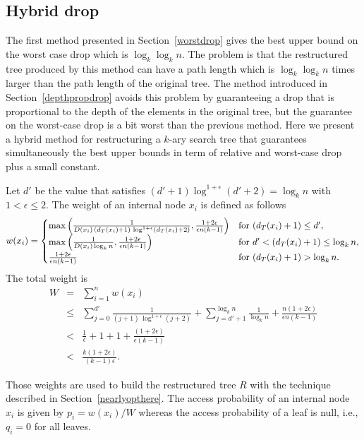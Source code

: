 \documentclass{llncs}\usepackage[english]{babel}
\begin{document}
\subsection{Hybrid drop}
\label{hybrid}
The first method presented in Section~\ref{worstdrop} gives the best upper bound on the worst case drop which is $\log_k \log_k n$. The problem is that the restructured tree produced by this method can have a path length which is $\log_k \log_k n$ times larger than the path length of the original tree. The method introduced in Section~\ref{depthpropdrop} avoids this problem by guaranteeing a drop that is proportional to the depth of the elements in the original tree, but the guarantee on the worst-case drop is a bit worst than the previous method. Here we present a hybrid method for restructuring a $k$-ary search tree that guarantees simultaneously the best upper bounds in term of relative and worst-case drop plus a small constant. 

Let $d'$ be the value that satisfies $(d'+1)\log^{1+\epsilon}(d'+2)=\log_k n$ with $1<\epsilon \leq 2$. The weight of an internal node $x_i$ is defined as follows
\vspace{-0.2cm}
$$
w(x_i)=
\begin{cases}
\max\left( \frac{1}{D(x_i) \, (d_T(x_i)+1)\, \log^{1+\epsilon}(d_T(x_i)+2)}, \frac{1+2\epsilon}{\epsilon n (k-1)}\right) & \text{for  $(d_T(x_i)+1)\leq d'$,}\\
\max\left( \frac{1}{D(x_i) \log_k n} , \frac{1+2\epsilon}{\epsilon n (k-1)}\right) & \text{for  $d'< (d_T(x_i)+1)\leq \log_k n$,}\\
\frac{1+2\epsilon}{\epsilon n (k-1)} & \text{for  $ (d_T(x_i)+1)> \log_k n$.}
\end{cases}
$$
The total weight is 
\vspace{-0.2cm}
\begin{eqnarray*}
W&=&\sum_{i=1}^n w(x_i)\\
&\leq&  \sum_{j=0}^{d'}\frac{1}{ (j+1)\, \log^{1+\epsilon}(j+2)} + \sum_{j=d'+1}^{\log_k n} \frac{1}{ \log_k n} + \frac{n(1+2\epsilon)}{\epsilon n (k-1)}\\
&<&  \frac{1}{\epsilon}+1 + 1+ \frac{(1+2\epsilon)}{\epsilon (k-1)}\\
&<& \frac{k(1+2\epsilon)}{(k-1)\epsilon}.
\end{eqnarray*}

Those weights are used to build the restructured tree $R$ with the technique described in Section~\ref{nearlyopthere}. The access probability of an internal node $x_i$ is given by $p_i=w(x_i)/W$ whereas the access probability of a leaf is null, i.e., $q_i=0$ for all leaves.
\end{document}
